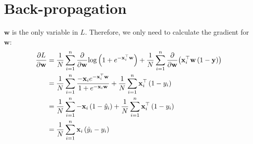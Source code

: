 \documentclass{article}
\begin{document}
\section{Back-propagation}
$\mathbf{w}$ is the only variable in $L$. Therefore, we only need to calculate the gradient for $\mathbf{w}$:
\begin{align}
    \frac{\partial L}{\partial\mathbf{w}} &= \frac{1}{N}\sum_{i = 1}^{n}{\frac{\partial}{\partial\mathbf{w}}{\log\left(1 + e^{-\mathbf{x}^\top_i\mathbf{w}}\right)}} + \frac{1}{N}\sum_{i = 1}^{n}{\frac{\partial}{\partial\mathbf{w}}{\left(\mathbf{x}^\top_i\mathbf{w}\left(1 - \mathbf{y}\right)\right)}} \\
    &= \frac{1}{N}\sum_{i = 1}^{n}{\frac{-\mathbf{x}_ie^{-\mathbf{x}^\top_i\mathbf{w}}}{1 + e^{-\mathbf{x}_i\mathbf{w}}}} +  \frac{1}{N}\sum_{i = 1}^{n}{\mathbf{x}_i^\top\left(1 - y_i\right)} \\
    &= \frac{1}{N}\sum_{i = 1}^{n}{-\mathbf{x}_i\left(1 - \hat{y}_i\right)} + \frac{1}{N}\sum_{i = 1}^{n}{\mathbf{x}_i^\top\left(1 - y_i\right)} \\
    &= \frac{1}{N}\sum_{i = 1}^{n}{\mathbf{x}_i\left(\hat{y}_i - y_i\right)}
\end{align}
\end{document}
